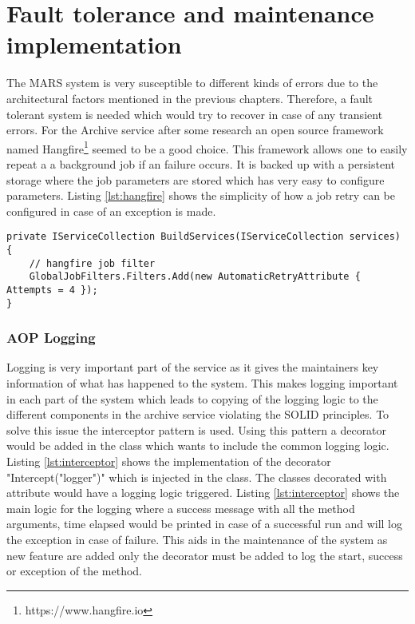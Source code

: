 \newpage
\section{Fault tolerance and maintenance implementation}
The MARS system is very susceptible to different kinds of errors due to the architectural factors mentioned in the previous chapters. Therefore, a fault tolerant
system is needed which would try to recover in case of any transient errors. For the Archive service after some research an open source framework
named Hangfire\footnote{https://www.hangfire.io} seemed to be a good choice. This framework allows one to easily repeat a a background job if an failure
occurs. It is backed up with a persistent storage where the job parameters are stored which has very easy to configure parameters. Listing \ref{lst:hangfire}
shows the simplicity of how a job retry can be configured in case of an exception is made. 

\begin{lstlisting}[language={[Sharp]C}, caption={Hangfire retry attempt configuration}, captionpos=b,label={lst:hangfire}]
private IServiceCollection BuildServices(IServiceCollection services)
{
    // hangfire job filter
    GlobalJobFilters.Filters.Add(new AutomaticRetryAttribute { Attempts = 4 });
}
\end{lstlisting}

\subsubsection{AOP Logging}
Logging is very important part of the service as it gives the maintainers key information of what has happened to the system. This makes logging important
in each part of the system which leads to copying of the logging logic to the different components in the archive service violating the SOLID principles. 
To solve this issue the interceptor pattern is used. Using this pattern a decorator would be added in the class which wants to include the common
logging logic. Listing \ref{lst:interceptor} shows the implementation of the decorator "Intercept("logger")" which is injected in the class. The 
classes decorated with attribute would have a logging logic triggered. Listing \ref{lst:interceptor} shows the main logic for the logging where a success message
with all the method arguments, time elapsed would be printed in case of a successful run and will log the exception in case of failure. This aids in the maintenance
of the system as new feature are added only the decorator must be added to log the start, success or exception of the method.

